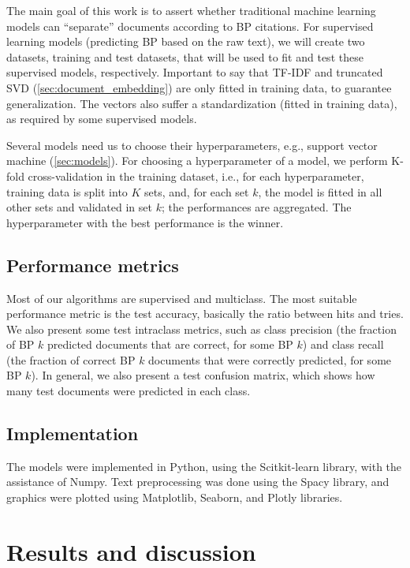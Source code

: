 \documentclass[twocolumn]{article}
\begin{document}
                  The main goal of this work is to assert whether traditional machine learning models can ``separate'' documents according to BP citations. For supervised learning models (predicting BP based on the raw text), we will create two datasets, training and test datasets, that will be used to fit and test these supervised models, respectively. Important to say that TF-IDF and truncated SVD (\autoref{sec:document_embedding}) are only fitted in training data, to guarantee generalization. The vectors also suffer a standardization (fitted in training data), as required by some supervised models.

                  Several models need us to choose their hyperparameters, e.g., support vector machine (\autoref{sec:models}). For choosing a hyperparameter of a model, we perform K-fold cross-validation in the training dataset, i.e., for each hyperparameter, training data is split into $K$ sets, and, for each set $k$, the model is fitted in all other sets and validated in set $k$; the performances are aggregated. The hyperparameter with the best performance is the winner.

            \subsection{Performance metrics}

                  Most of our algorithms are supervised and multiclass. The most suitable performance metric is the test accuracy, basically the ratio between hits and tries. We also present some test intraclass metrics, such as class precision (the fraction of BP $k$ predicted documents that are correct, for some BP $k$) and class recall (the fraction of correct BP $k$ documents that were correctly predicted, for some BP $k$). In general, we also present a test confusion matrix, which shows how many test documents were predicted in each class.

            \subsection{Implementation}

                  The models were implemented in Python, using the Scitkit-learn library, with the assistance of Numpy. Text preprocessing was done using the Spacy library, and graphics were plotted using Matplotlib, Seaborn, and Plotly libraries.

      \section{Results and discussion}
            \label{sec:results}
\end{document}
